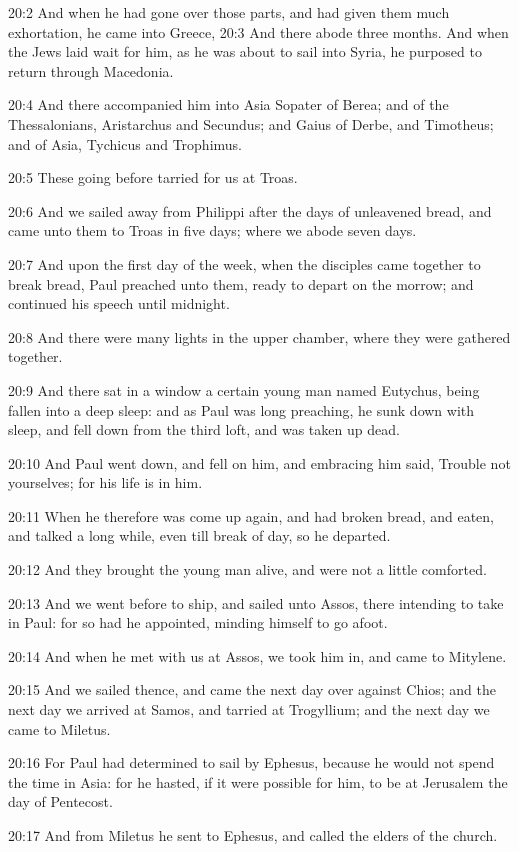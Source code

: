 20:2 And when he had gone over those parts, and had given them much exhortation, he came into Greece, 20:3 And there abode three months.  And when the Jews laid wait for him, as he was about to sail into Syria, he purposed to return through Macedonia.

20:4 And there accompanied him into Asia Sopater of Berea; and of the Thessalonians, Aristarchus and Secundus; and Gaius of Derbe, and Timotheus; and of Asia, Tychicus and Trophimus.

20:5 These going before tarried for us at Troas.

20:6 And we sailed away from Philippi after the days of unleavened bread, and came unto them to Troas in five days; where we abode seven days.

20:7 And upon the first day of the week, when the disciples came together to break bread, Paul preached unto them, ready to depart on the morrow; and continued his speech until midnight.

20:8 And there were many lights in the upper chamber, where they were gathered together.

20:9 And there sat in a window a certain young man named Eutychus, being fallen into a deep sleep: and as Paul was long preaching, he sunk down with sleep, and fell down from the third loft, and was taken up dead.

20:10 And Paul went down, and fell on him, and embracing him said, Trouble not yourselves; for his life is in him.

20:11 When he therefore was come up again, and had broken bread, and eaten, and talked a long while, even till break of day, so he departed.

20:12 And they brought the young man alive, and were not a little comforted.

20:13 And we went before to ship, and sailed unto Assos, there intending to take in Paul: for so had he appointed, minding himself to go afoot.

20:14 And when he met with us at Assos, we took him in, and came to Mitylene.

20:15 And we sailed thence, and came the next day over against Chios; and the next day we arrived at Samos, and tarried at Trogyllium; and the next day we came to Miletus.

20:16 For Paul had determined to sail by Ephesus, because he would not spend the time in Asia: for he hasted, if it were possible for him, to be at Jerusalem the day of Pentecost.

20:17 And from Miletus he sent to Ephesus, and called the elders of the church.

